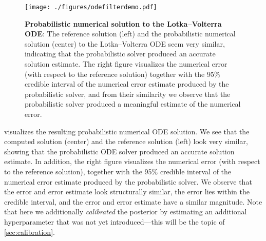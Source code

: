 \documentclass{mimosis}
\begin{document}
\begin{figure}[t]
\centering
\texttt{[image: ./figures/odefilterdemo.pdf]}
\caption{\label{fig:odefilterdemo}\textbf{Probabilistic numerical solution to the Lotka--Volterra ODE}: The reference solution (left) and the probabilistic numerical solution (center) to the Lotka--Volterra ODE seem very similar, indicating that the probabilistic solver produced an accurate solution estimate. The right figure visualizes the numerical error (with respect to the reference solution) together with the 95\% credible interval of the numerical error estimate produced by the probabilistic solver, and from their similarity we observe that the probabilistic solver produced a meaningful estimate of the numerical error.}
\end{figure}


 visualizes the resulting probabilistic numerical ODE solution.
We see that the computed solution (center) and the reference solution (left) look very similar, showing that the probabilistic ODE solver produced an accurate solution estimate.
In addition, the right figure visualizes the numerical error (with respect to the reference solution), together with the 95\% credible interval of the numerical error estimate produced by the probabilistic solver.
We observe that the error and error estimate look structurally similar, the error lies within the credible interval, and the error and error estimate have a similar magnitude.
Note that here we additionally \emph{calibrated} the posterior
by estimating an additional hyperparameter that was not yet introduced---this will be the topic of \cref{sec:calibration}.
\end{document}
